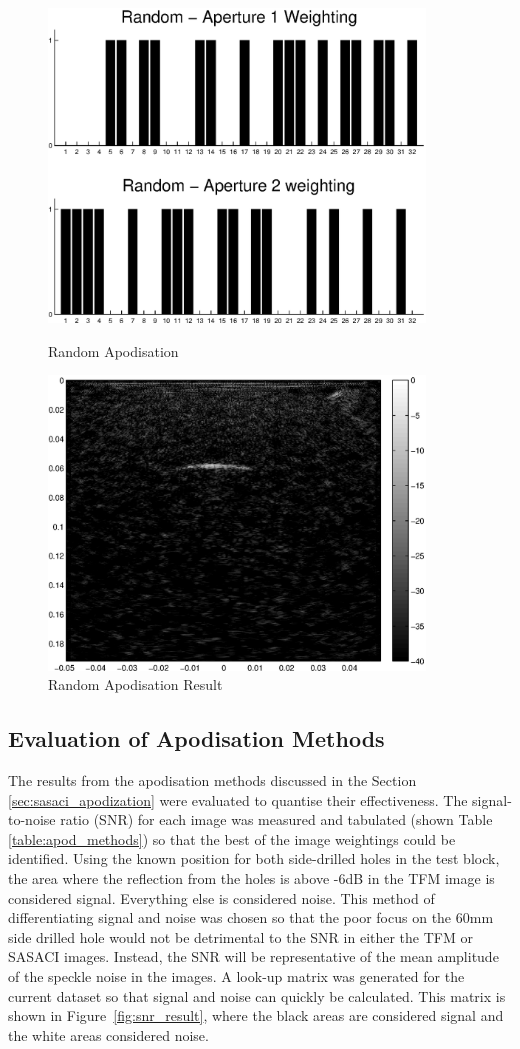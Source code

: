 \begin{figure}[p]
\centering
		\includegraphics[width=100mm]{Random.eps}
		\caption{Random Apodisation}
		\label{fig:apod_ran}

		\includegraphics[width=100mm]{SAC_Random.eps}
		\caption{Random Apodisation Result}
		\label{fig:apod_ran_result}
\end{figure}
\clearpage
\subsection{Evaluation of Apodisation Methods}
The results from the apodisation methods discussed in the Section \ref{sec:sasaci_apodization} were evaluated to quantise their effectiveness. The signal-to-noise ratio (SNR) for each image was measured and tabulated (shown Table \ref{table:apod_methods}) so that the best of the image weightings could be identified. Using the known position for both side-drilled holes in the test block, the area where the reflection from the holes is above -6dB in the TFM image is considered signal. Everything else is considered noise. This method of differentiating signal and noise was chosen so that the poor focus on the 60mm side drilled hole would not be detrimental to the SNR in either the TFM or SASACI images. Instead, the SNR will be representative of the mean amplitude of the speckle noise in the images. A look-up matrix was generated for the current dataset so that signal and noise can quickly be calculated. This matrix is shown in Figure~\ref{fig:snr_result}, where the black areas are considered signal and the white areas considered noise.

